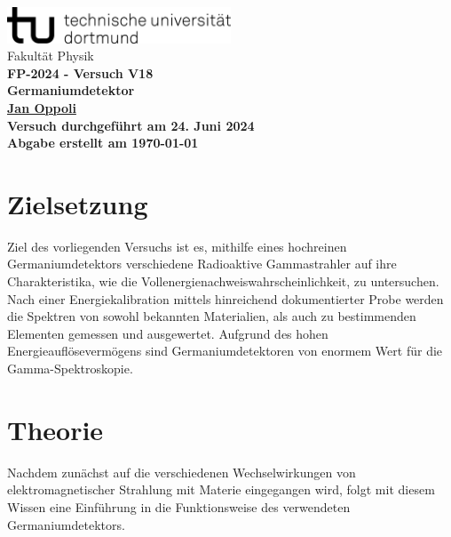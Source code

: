 \documentclass[12pt]{article}
\begin{document}
\begin{titlepage}
  \centering
  \vspace*{1cm}
  \includegraphics[width=0.5\textwidth]{Ressourcen/tud_logo_schwarz(RGB)}\\
  \vspace*{0.25cm}
  \large\textmd{Fakultät Physik} \\
  \vspace*{6cm}
  \huge \bfseries FP-2024 - Versuch V18\\
  \vspace*{0.25cm}
  \large Germaniumdetektor\\
  \vspace*{0.25cm}
  \large\textmd{\href{mailto:jan.oppoli@tu-dortmund.de}{Jan Oppoli}} \\
  \vfill
  \small\textmd{Versuch durchgeführt am 24. Juni 2024}\\
  \small\textmd{Abgabe erstellt am \today}
\end{titlepage}
\tableofcontents 
\newpage

\section{Zielsetzung}\label{sec:zielsetzung}
Ziel des vorliegenden Versuchs ist es, mithilfe eines hochreinen Germaniumdetektors verschiedene Radioaktive Gammastrahler auf ihre Charakteristika, wie die Vollenergienachweiswahrscheinlichkeit, zu untersuchen.
Nach einer Energiekalibration mittels hinreichend dokumentierter Probe werden die Spektren von sowohl bekannten Materialien, als auch zu bestimmenden Elementen gemessen und ausgewertet.
Aufgrund des hohen Energieauflösevermögens sind Germaniumdetektoren von enormem Wert für die Gamma-Spektroskopie.
\section{Theorie}\label{sec:theorie}
Nachdem zunächst auf die verschiedenen Wechselwirkungen von elektromagnetischer Strahlung mit Materie eingegangen wird, folgt mit diesem Wissen eine Einführung in die Funktionsweise des verwendeten Germaniumdetektors.
\end{document}

